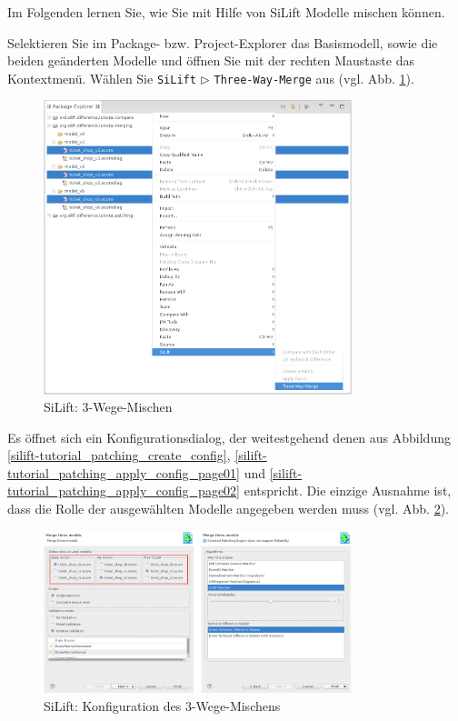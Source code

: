 Im Folgenden lernen Sie, wie Sie mit Hilfe von SiLift Modelle mischen können.

Selektieren Sie im Package- bzw. Project-Explorer das Basismodell, sowie die beiden geänderten Modelle und öffnen Sie mit der rechten Maustaste das Kontextmenü.
Wählen Sie \texttt{SiLift} $\triangleright$  \texttt{Three-Way-Merge} aus (vgl. Abb. \ref{silift-tutorial_merging_contextmenu}).

\begin{figure}[H]
\centering
\includegraphics[width=0.8\textwidth]{merging/graphics/silift-tutorial_merging_contextmenu.png}
\caption{SiLift: 3-Wege-Mischen}
\label{silift-tutorial_merging_contextmenu}
\end{figure}

Es öffnet sich ein Konfigurationsdialog, der weitestgehend denen aus Abbildung \ref{silift-tutorial_patching_create_config}, \ref{silift-tutorial_patching_apply_config_page01} und \ref{silift-tutorial_patching_apply_config_page02} entspricht.
Die einzige Ausnahme ist, dass die Rolle der ausgewählten Modelle angegeben werden muss (vgl. Abb. \ref{silift-tutorial_merging_wizard}).

\begin{figure}[H]
\centering
\includegraphics[width=0.8\textwidth]{merging/graphics/silift-tutorial_merging_wizard.png}
\caption{SiLift: Konfiguration des 3-Wege-Mischens}
\label{silift-tutorial_merging_wizard}
\end{figure}

